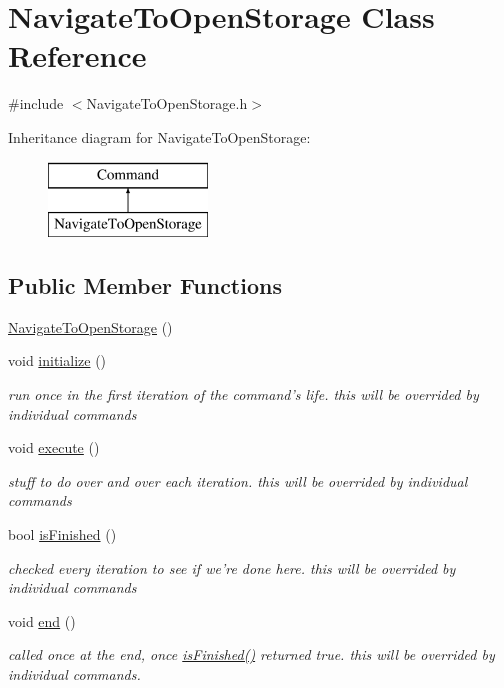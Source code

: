 \hypertarget{classNavigateToOpenStorage}{\section{Navigate\-To\-Open\-Storage Class Reference}
\label{classNavigateToOpenStorage}
}


{\ttfamily \#include $<$Navigate\-To\-Open\-Storage.\-h$>$}

Inheritance diagram for Navigate\-To\-Open\-Storage\-:\begin{figure}[H]
\begin{center}
\leavevmode
\includegraphics[height=2.000000cm]{classNavigateToOpenStorage}
\end{center}
\end{figure}
\subsection*{Public Member Functions}
\begin{DoxyCompactItemize}
\item 
\hyperlink{classNavigateToOpenStorage_a4f9a2dcb328f82d629f4d9223ee8dc1b}{Navigate\-To\-Open\-Storage} ()
\item 
void \hyperlink{classNavigateToOpenStorage_a206ea745d04ffce485b59a7732c932e3}{initialize} ()
\begin{DoxyCompactList}\small\item\em run once in the first iteration of the command's life. this will be overrided by individual commands \end{DoxyCompactList}\item 
void \hyperlink{classNavigateToOpenStorage_a12d20167227f6359b0fe95a5d4bd3257}{execute} ()
\begin{DoxyCompactList}\small\item\em stuff to do over and over each iteration. this will be overrided by individual commands \end{DoxyCompactList}\item 
bool \hyperlink{classNavigateToOpenStorage_ad0b18ef9e40b69bccc01986426e3605c}{is\-Finished} ()
\begin{DoxyCompactList}\small\item\em checked every iteration to see if we're done here. this will be overrided by individual commands \end{DoxyCompactList}\item 
void \hyperlink{classNavigateToOpenStorage_af25a3397f1d4aaa94982615fe81f30a2}{end} ()
\begin{DoxyCompactList}\small\item\em called once at the end, once \hyperlink{classNavigateToOpenStorage_ad0b18ef9e40b69bccc01986426e3605c}{is\-Finished()} returned true. this will be overrided by individual commands. \end{DoxyCompactList}\end{DoxyCompactItemize}

